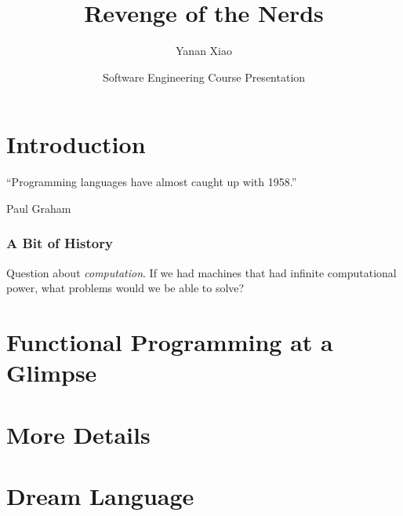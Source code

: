 \documentclass[12pt,hyperref=true,mathserif]{beamer}
\begin{document}
\title{Revenge of the Nerds}
\author{Yanan Xiao}
\date[CIS502 Presentation]{Software Engineering Course Presentation}

\begin{frame}
\titlepage
\end{frame}

\begin{frame}
  \tableofcontents
\end{frame}

\section{Introduction}


\begin{frame}
\begin{center}
``Programming languages have almost caught up with 1958.''
\end{center}
\hfill  Paul Graham  
\end{frame}

\begin{frame}
  \frametitle{A Bit of History}
  Question about \emph{computation}. If we had machines that had
  infinite computational power, what problems would we be able to
  solve?
\end{frame}

\section{Functional Programming at a Glimpse}


\begin{frame}
  
\end{frame}

\section{More Details}


\begin{frame}
  
\end{frame}

\section{Dream Language}


\begin{frame}
  
\end{frame}
\end{document}

